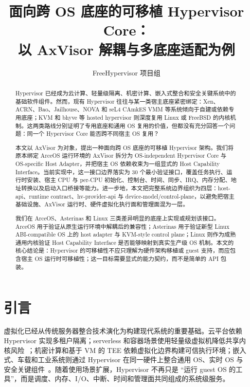 \documentclass[a4paper,11pt]{article}
\title{面向跨 OS 底座的可移植 Hypervisor Core：\\以 AxVisor 解耦与多底座适配为例}
\author{FreeHypervisor 项目组}
\date{}
\begin{document}
\maketitle

\begin{abstract}
Hypervisor 已经成为云计算、轻量级隔离、机密计算、嵌入式整合和安全关键系统中的基础软件组件。然而，现有 Hypervisor 往往与某一类宿主底座紧密绑定：Xen、ACRN、Bao、Jailhouse、NOVA 和 seL4 CAmkES VMM 等系统倾向于自建或依赖专用底座；KVM 和 bhyve 等 hosted hypervisor 则深度复用 Linux 或 FreeBSD 的内核机制。这两类路线分别证明了专用底座和通用 OS 复用的价值，但都没有充分回答一个问题：同一个 Hypervisor Core 能否跨不同宿主 OS 复用？

本文以 AxVisor 为对象，提出一种面向跨 OS 底座的可移植 Hypervisor 架构。我们将原本绑定 ArceOS 运行环境的 AxVisor 拆分为 OS-independent Hypervisor Core 与 OS-specific Host Adapter，并把宿主 OS 依赖收束为一组显式的 Host Capability Interface。当前实现中，这一接口边界落实为 30 个最小验证接口，覆盖任务执行、运行时安装、宿主 CPU 与 per-CPU 初始化、控制台、时间、同步、IRQ、内存分配、地址转换以及启动入口桥接等能力。进一步地，本文把完整系统边界组织为四层：host-api、runtime contract、hv-provider-api 与 device-model/control-plane，以避免把宿主基础设施、AxVisor 运行时、硬件虚拟化执行面和管理面混为一层。

我们在 ArceOS、Asterinas 和 Linux 三类差异明显的底座上实现或规划该接口。ArceOS 用于验证从原生运行环境中解耦后的兼容性；Asterinas 用于验证新型 Linux ABI-compatible OS 上的 host adapter 与 KVM-style control plane；Linux 则作为成熟通用内核验证 Host Capability Interface 是否能够映射到真实生产级 OS 机制。本文的核心结论是：Hypervisor 的可移植性不应只理解为硬件架构移植或 guest 支持，而应包含宿主 OS 运行时可移植性；这一目标需要显式的能力契约，而不是简单的 API 包装。
\end{abstract}

\section{引言}

虚拟化已经从传统服务器整合技术演化为构建现代系统的重要基础。云平台依赖 Hypervisor 实现多租户隔离；serverless 和容器场景使用轻量级虚拟机降低共享内核风险~\cite{holmes2024severifast,goethals2022functional}；机密计算和基于 VM 的 TEE 依赖虚拟化边界构建可信执行环境；嵌入式、车载和工业系统则通过 Hypervisor 在同一硬件上整合通用 OS、实时 OS 与安全关键组件~\cite{lozano2023comprehensive,cilardo2022virtualization}。随着使用场景扩展，Hypervisor 不再只是 ``运行 guest OS 的工具''，而是调度、内存、I/O、中断、时间和管理面共同组成的系统级服务。
\end{document}
